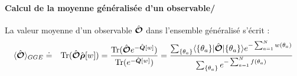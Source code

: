 

\paragraph{Calcul de la moyenne généralisée d’un observable/}
La valeur moyenne d’un observable $\hat{\bm{\mathcal{O}}}$ dans l’ensemble généralisé s’écrit :
\begin{eqnarray}
	\langle \hat{\bm{\mathcal{O}}} \rangle_{GGE} & \doteq & \displaystyle  \text{Tr} (\hat{\bm{\mathcal{O}}}\hat{\bm{\rho}}[w]) = \frac{\text{Tr} (\hat{\bm{\mathcal{O}}}e^{-\hat{\bm{Q}}[w]})}{\text{Tr} (e^{-\hat{\bm{Q}}[w]})}	 = \frac{\sum_{\{\theta_a \}} \langle  \{ \theta_a\}  \vert   \hat{\bm{\mathcal{O}}} \vert \{ \theta_a\} \rangle e^{- \sum_{a = 1}^N w(\theta_a) }  }{\sum_{\{\theta_a  \}} e^{- \sum_{a = 1}^N  f(\theta_a) } }
\end{eqnarray}
	
